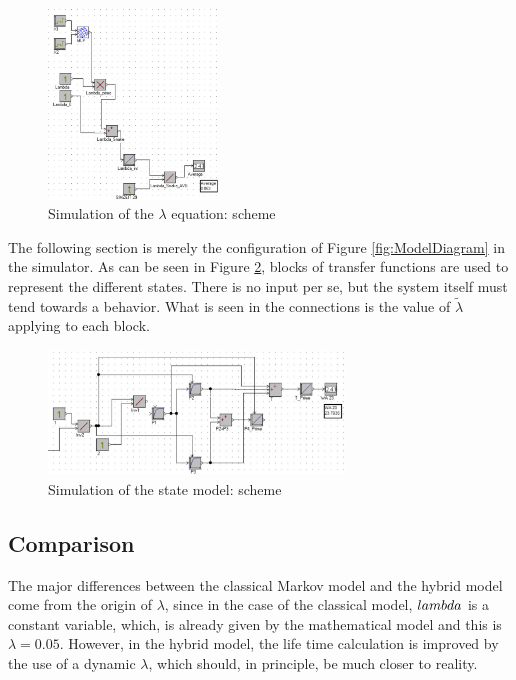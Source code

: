 \documentclass{article}
\begin{document}
\begin{doublespacing}
\begin{figure}[H] 
    \centering
    \includegraphics[width=0.4\textwidth]{Images/SimulationEquation.JPG} 
    \caption{Simulation of the $\lambda$ equation: scheme} 
    \label{fig:SimulationEquation} 
\end{figure}

\par The following section is merely the configuration of Figure \ref{fig:ModelDiagram} in the simulator. As can be seen in Figure \ref{fig:SimulationModel}, blocks of transfer functions are used to represent the different states. There is no input per se, but the system itself must tend towards a behavior. What is seen in the connections is the value of $\tilde{\lambda} $ applying to each block. 

\begin{figure}[H] 
    \centering
    \includegraphics[width=0.7\textwidth]{Images/SimulationModel.JPG} 
    \caption{Simulation of the state model: scheme} 
    \label{fig:SimulationModel} 
\end{figure}


\subsection{Comparison}

\par The major differences between the classical Markov model and the hybrid model come from the origin of $\lambda$, since in the case of the classical model, $\\lambda$ is a constant variable, which, is already given by the mathematical model and this is $\lambda = 0.05$. However, in the hybrid model, the life time calculation is improved by the use of a dynamic $\lambda$, which should, in principle, be much closer to reality.



\end{doublespacing}
\end{document}
